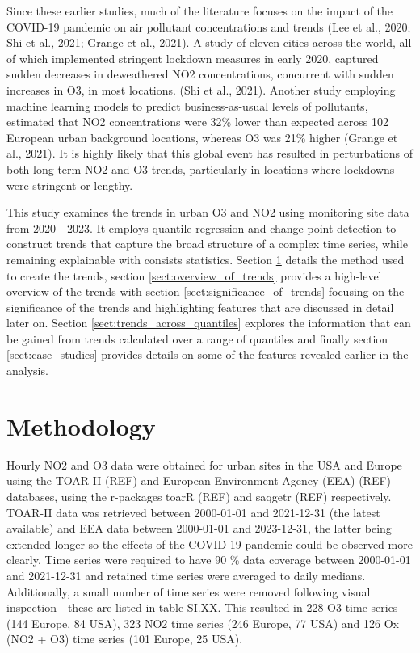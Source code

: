 \documentclass[journal abbreviation, manuscript]{copernicus}
\begin{document}
Since these earlier studies, much of the literature focuses on the impact of the COVID-19 pandemic on air pollutant concentrations and trends (Lee et al., 2020; Shi et al., 2021; Grange et al., 2021). A study of eleven cities across the world, all of which implemented stringent lockdown measures in early 2020, captured sudden decreases in deweathered NO2 concentrations, concurrent with sudden increases in O3, in most locations. (Shi et al., 2021). Another study employing machine learning models to predict business-as-usual levels of pollutants, estimated that NO2 concentrations were 32\% lower than expected across 102 European urban background locations, whereas O3 was 21\% higher (Grange et al., 2021). It is highly likely that this global event has resulted in perturbations of both long-term NO2 and O3 trends, particularly in locations where lockdowns were stringent or lengthy.

This study examines the trends in urban O3 and NO2 using monitoring site data from 2020 - 2023. It employs quantile regression and change point detection to construct trends that capture the broad structure of a complex time series, while remaining explainable with consists statistics. Section \ref{sect:method} details the method used to create the trends, section \ref{sect:overview_of_trends} provides a high-level overview of the trends with section \ref{sect:significance_of_trends} focusing on the significance of the trends and highlighting features that are discussed in detail later on. Section \ref{sect:trends_across_quantiles} explores the information that can be gained from trends calculated over a range of quantiles and finally section \ref{sect:case_studies} provides details on some of the features revealed earlier in the analysis. 


\section{Methodology} \label{sect:method}
Hourly NO2 and O3 data were obtained for urban sites in the USA and Europe using the TOAR-II (REF) and European Environment Agency (EEA) (REF) databases, using the r-packages toarR (REF) and saqgetr (REF) respectively. TOAR-II data was retrieved between 2000-01-01 and 2021-12-31 (the latest available) and EEA data between 2000-01-01 and 2023-12-31, the latter being extended longer so the effects of the COVID-19 pandemic could be observed more clearly. Time series were required to have 90 \% data coverage between 2000-01-01 and 2021-12-31 and retained time series were averaged to daily medians. Additionally, a small number of time series were removed following visual inspection - these are listed in table SI.XX. This resulted in 228 O3 time series (144 Europe, 84 USA), 323 NO2 time series (246 Europe, 77 USA) and 126 Ox (NO2 + O3) time series (101 Europe, 25 USA).
\end{document}
